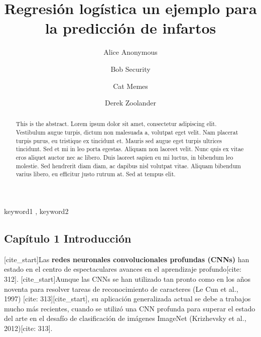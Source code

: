 \documentclass[
  super,
  preprint,
  3p]{elsarticle}
\begin{document}
\begin{frontmatter}
\title{Regresión logística un ejemplo para la predicción de infartos}
\author[1]{Alice Anonymous%
%
}
\author[2]{Bob Security%
%
}
\author[2]{Cat Memes%
%
}
\author[]{Derek Zoolander%
%
}



        
\begin{abstract}
This is the abstract. Lorem ipsum dolor sit amet, consectetur adipiscing
elit. Vestibulum augue turpis, dictum non malesuada a, volutpat eget
velit. Nam placerat turpis purus, eu tristique ex tincidunt et. Mauris
sed augue eget turpis ultrices tincidunt. Sed et mi in leo porta
egestas. Aliquam non laoreet velit. Nunc quis ex vitae eros aliquet
auctor nec ac libero. Duis laoreet sapien eu mi luctus, in bibendum leo
molestie. Sed hendrerit diam diam, ac dapibus nisl volutpat vitae.
Aliquam bibendum varius libero, eu efficitur justo rutrum at. Sed at
tempus elit.
\end{abstract}





\begin{keyword}
    keyword1 \sep 
    keyword2
\end{keyword}
\end{frontmatter}
    

\subsection{Capítulo 1
Introducción}\label{capuxedtulo-1-introducciuxf3n}

{[}cite\_start{]}Las \textbf{redes neuronales convolucionales profundas
(CNNs)} han estado en el centro de espectaculares avances en el
aprendizaje profundo{[}cite: 312{]}. {[}cite\_start{]}Aunque las CNNs se
han utilizado tan pronto como en los años noventa para resolver tareas
de reconocimiento de caracteres (Le Cun et al., 1997) {[}cite:
313{]}{[}cite\_start{]}, su aplicación generalizada actual se debe a
trabajos mucho más recientes, cuando se utilizó una CNN profunda para
superar el estado del arte en el desafío de clasificación de imágenes
ImageNet (Krizhevsky et al., 2012){[}cite: 313{]}.
\end{document}
